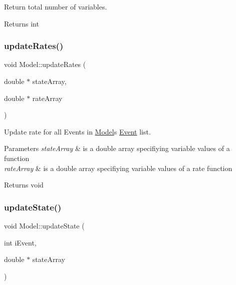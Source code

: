 Return total number of variables. 

\begin{DoxyReturn}{Returns}
int 
\end{DoxyReturn}
\mbox{\label{class_model_a3f2fd71261c87162718864d7efc67f2f}} 
\subsubsection{\texorpdfstring{update\+Rates()}{updateRates()}}
{\footnotesize\ttfamily void Model\+::update\+Rates (\begin{DoxyParamCaption}\item[{double $\ast$}]{state\+Array,  }\item[{double $\ast$}]{rate\+Array }\end{DoxyParamCaption})}



Update rate for all Events in \hyperlink{class_model}{Model}\textquotesingle{}s \hyperlink{class_event}{Event} list. 


\begin{DoxyParams}{Parameters}
{\em state\+Array} & is a double array specifiying variable values of a function \\
\hline
{\em rate\+Array} & is a double array specifiying variable values of a rate function \\
\hline
\end{DoxyParams}
\begin{DoxyReturn}{Returns}
void 
\end{DoxyReturn}
\mbox{\label{class_model_ad9e7a181a31a2a9fab052d11b1984afd}} 
\subsubsection{\texorpdfstring{update\+State()}{updateState()}}
{\footnotesize\ttfamily void Model\+::update\+State (\begin{DoxyParamCaption}\item[{int}]{i\+Event,  }\item[{double $\ast$}]{state\+Array }\end{DoxyParamCaption})}



